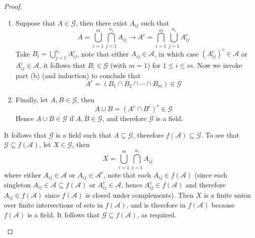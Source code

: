 \documentclass[12pt]{article}
\newcommand{\A}{\mathcal{A}}
\newcommand{\G}{\mathcal{G}}
\newcommand{\seq}{\subseteq}
\newcommand{\un}{\cup}
\newcommand{\ic}{\cap}
\begin{document}
\begin{proof}
\begin{enumerate}
\begin{enumerate}
            \item Suppose that $A \in \G$, then there exist $A_{ij}$ such that
            \[ A = \bigcup_{i=1}^{m} \bigcap_{j=1}^{n_i} A_{ij}  \longrightarrow A^{c} = \bigcap_{i=1}^{m} \bigcup_{j=1}^{n_i} A_{ij}^{c} \]
            Take $B_{i} = \bigcup_{j=1}^{n_i} A_{ij}^{c}$, note that either $A_{ij} \in \A$, in which case $(A_{ij}^{c})^c \in \A$ or $A_{ij}^{c} \in \A$, it follows that $B_i \in \G$ (with $m = 1$) for $1 \leq i \leq m$. Now we invoke part (b) (and induction) to conclude that
            \[ A^{c} = \left (B_1 \ic B_2 \ic \cdots \ic B_m \right) \in \G \] 
            \item Finally, let $A, B \in \G$, then
            \[ A \un B = (A^{c} \ic B^{c})^{c} \in \G \]
            Hence $A \un B \in \G$ if $A, B \in \G$, and therefore $\G$ is a field.
        \end{enumerate}
        It follows that $\G$ is a field such that $A \seq \G$, therefore $f(\A) \seq \G$. To see that $\G \seq f(\A)$, let $X \in \G$, then
        \[ X = \bigcup_{i=1}^{m} \bigcap_{j=1}^{n_i} A_{ij} \]
        where either $A_{ij} \in \A$ or $A_{ij} \in \A^{c}$, note that each $A_{ij} \in f(\A)$ (since each singleton $A_{ij} \in \A \seq f(\A)$ or $A_{ij}^{c} \in \A$, hence $A_{ij}^{c} \in f(\A)$ and therefore $A_{ij} \in f(\A)$ since $f(\A)$ is closed under complements). Then $X$ is a finite union over finite intersections of sets in $f(\A)$, and is therefore in $f(\A)$ because $f(\A)$ is a field. It follows that $\G \seq f(\A)$, as required. 
    \end{enumerate}
\end{proof}
\end{document}
